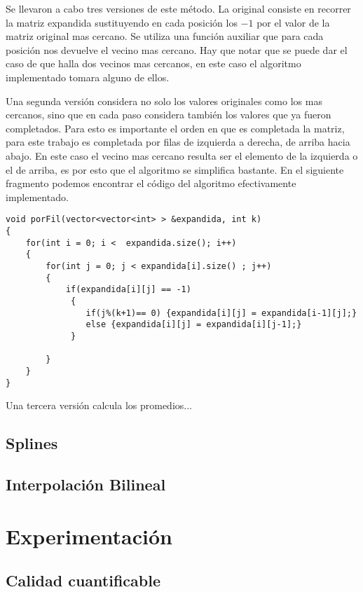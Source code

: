 \documentclass[a4paper]{article}
\begin{document}
Se llevaron a cabo tres versiones de este método. La original consiste en recorrer la matriz expandida sustituyendo en cada posición los $ -1 $ por el valor de la matriz original mas cercano. Se utiliza una función auxiliar que para cada posición nos devuelve el vecino mas cercano. Hay que notar que se puede dar el caso de que halla dos vecinos mas cercanos, en este caso el algoritmo implementado tomara alguno de ellos.

Una segunda versión considera no solo los valores originales como los mas cercanos, sino que en cada paso considera también los valores que ya fueron completados. Para esto es importante el orden en que es completada la matriz, para este trabajo es completada por filas de izquierda a derecha, de arriba hacia abajo. En este caso el vecino mas cercano resulta ser el elemento de la izquierda o el de arriba, es por esto que el algoritmo se simplifica bastante. En el siguiente fragmento podemos encontrar el código del algoritmo efectivamente implementado.

\bigskip
\begin{lstlisting}
void porFil(vector<vector<int> > &expandida, int k)
{
    for(int i = 0; i <  expandida.size(); i++)
    {
    	for(int j = 0; j < expandida[i].size() ; j++)
    	{
    		if(expandida[i][j] == -1)
    		 {
    		 	if(j%(k+1)== 0) {expandida[i][j] = expandida[i-1][j];}
    		 	else {expandida[i][j] = expandida[i][j-1];}
    		 }

    	}
    }
}
\end{lstlisting}

Una tercera versión calcula los promedios...


\subsection{Splines}


\subsection{Interpolación Bilineal}

\section{Experimentación}

\subsection{Calidad cuantificable}
\end{document}
